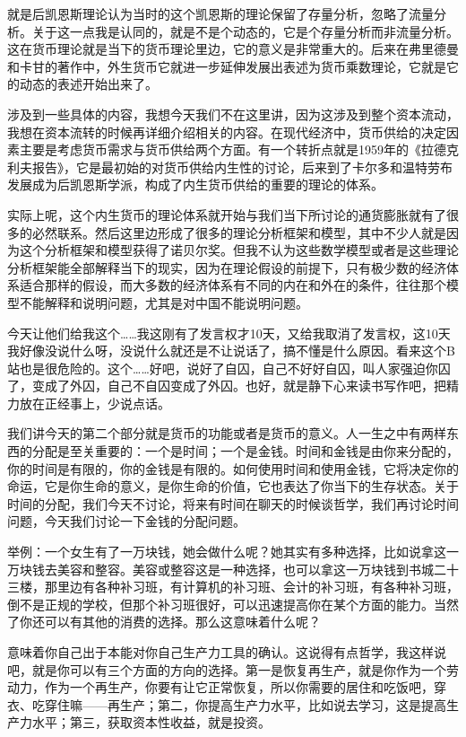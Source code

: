 \documentclass[UTF8, 12pt, a4paper]{ctexrep}
\begin{document}
就是后凯恩斯理论认为当时的这个凯恩斯的理论保留了存量分析，忽略了流量分析。关于这一点我是认同的，就是不是个动态的，它是个存量分析而非流量分析。这在货币理论就是当下的货币理论里边，它的意义是非常重大的。后来在弗里德曼和卡甘的著作中，外生货币它就进一步延伸发展出表述为货币乘数理论，它就是它的动态的表述开始出来了。

涉及到一些具体的内容，我想今天我们不在这里讲，因为这涉及到整个资本流动，我想在资本流转的时候再详细介绍相关的内容。在现代经济中，货币供给的决定因素主要是考虑货币需求与货币供给两个方面。有一个转折点就是1959年的《拉德克利夫报告》，它是最初始的对货币供给内生性的讨论，后来到了卡尔多和温特劳布发展成为后凯恩斯学派，构成了内生货币供给的重要的理论的体系。

实际上呢，这个内生货币的理论体系就开始与我们当下所讨论的通货膨胀就有了很多的必然联系。然后这里边形成了很多的理论分析框架和模型，其中不少人就是因为这个分析框架和模型获得了诺贝尔奖。但我不认为这些数学模型或者是这些理论分析框架能全部解释当下的现实，因为在理论假设的前提下，只有极少数的经济体系适合那样的假设，而大多数的经济体系有不同的内在和外在的条件，往往那个模型不能解释和说明问题，尤其是对中国不能说明问题。

今天让他们给我这个……我这刚有了发言权才10天，又给我取消了发言权，这10天我好像没说什么呀，没说什么就还是不让说话了，搞不懂是什么原因。看来这个B站也是很危险的。这个……好吧，说好了自囚，自己不好好自囚，叫人家强迫你囚了，变成了外囚，自己不自囚变成了外囚。也好，就是静下心来读书写作吧，把精力放在正经事上，少说点话。

我们讲今天的第二个部分就是货币的功能或者是货币的意义。人一生之中有两样东西的分配是至关重要的：一个是时间；一个是金钱。时间和金钱是由你来分配的，你的时间是有限的，你的金钱是有限的。如何使用时间和使用金钱，它将决定你的命运，它是你生命的意义，是你生命的价值，它也表达了你当下的生存状态。关于时间的分配，我们今天不讨论，将来有时间在聊天的时候谈哲学，我们再讨论时间问题，今天我们讨论一下金钱的分配问题。

举例：一个女生有了一万块钱，她会做什么呢？她其实有多种选择，比如说拿这一万块钱去美容和整容。美容或整容这是一种选择，也可以拿这一万块钱到书城二十三楼，那里边有各种补习班，有计算机的补习班、会计的补习班，有各种补习班，倒不是正规的学校，但那个补习班很好，可以迅速提高你在某个方面的能力。当然了你还可以有其他的消费的选择。那么这意味着什么呢？

意味着你自己出于本能对你自己生产力工具的确认。这说得有点哲学，我这样说吧，就是你可以有三个方面的方向的选择。第一是恢复再生产，就是你作为一个劳动力，作为一个再生产，你要有让它正常恢复，所以你需要的居住和吃饭吧，穿衣、吃穿住嘛——再生产；第二，你提高生产力水平，比如说去学习，这是提高生产力水平；第三，获取资本性收益，就是投资。
\end{document}
